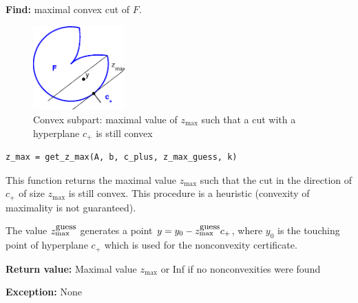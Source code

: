 \documentclass[a4paper]{article}
\theoremstyle{definition}
\begin{document}
\begin{enumerate}
{\bf Find:} maximal convex cut of $F$.

\begin{figure}[H]
	\centering\includegraphics[width=100pt]{fig/get_z_max}
	\caption{Convex subpart: maximal value of $z_{\max}$ such that a cut with a hyperplane $c_+$ is still convex}
\end{figure}

\begin{verbatim}
z_max = get_z_max(A, b, c_plus, z_max_guess, k)
\end{verbatim}

This function returns the maximal value $z_{\max}$ such that the cut in the direction of $c_+$ of size $z_{\max}$ is still convex. This procedure is a heuristic (convexity of maximality is not guaranteed).

The value $z_{\max}^{\mbox{\small guess}}$ generates a point $y=y_0-z_{\max}^{\mbox{\small guess}}c_+$, where $y_0$ is the touching point of hyperplane $c_+$ which is used for the nonconvexity certificate.

{\bf Return value:} Maximal value $z_{\max}$ or Inf if no nonconvexities were found

{\bf Exception:} None
\end{enumerate}
\end{document}
